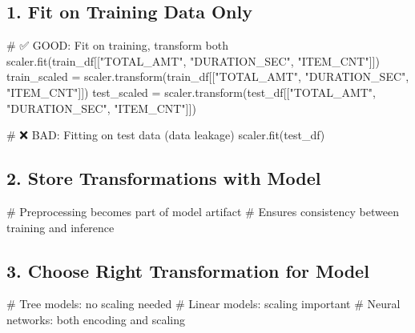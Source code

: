 \documentclass[
  letterpaper,
  DIV=11,
  numbers=noendperiod]{scrreprt}
\newenvironment{Shaded}{\begin{snugshade}}{\end{snugshade}}
\newcommand{\CommentTok}[1]{\textcolor[rgb]{0.37,0.37,0.37}{#1}}
\newcommand{\NormalTok}[1]{\textcolor[rgb]{0.00,0.23,0.31}{#1}}
\newcommand{\OperatorTok}[1]{\textcolor[rgb]{0.37,0.37,0.37}{#1}}
\newcommand{\StringTok}[1]{\textcolor[rgb]{0.13,0.47,0.30}{#1}}
\begin{document}
\hypertarget{fit-on-training-data-only}{%
\subsection{1. Fit on Training Data
Only}\label{fit-on-training-data-only}}

\begin{Shaded}
\begin{Highlighting}[]
\CommentTok{\# ✅ GOOD: Fit on training, transform both}
\NormalTok{scaler.fit(train\_df[[}\StringTok{"TOTAL\_AMT"}\NormalTok{, }\StringTok{"DURATION\_SEC"}\NormalTok{, }\StringTok{"ITEM\_CNT"}\NormalTok{]])}
\NormalTok{train\_scaled }\OperatorTok{=}\NormalTok{ scaler.transform(train\_df[[}\StringTok{"TOTAL\_AMT"}\NormalTok{, }\StringTok{"DURATION\_SEC"}\NormalTok{, }\StringTok{"ITEM\_CNT"}\NormalTok{]])}
\NormalTok{test\_scaled }\OperatorTok{=}\NormalTok{ scaler.transform(test\_df[[}\StringTok{"TOTAL\_AMT"}\NormalTok{, }\StringTok{"DURATION\_SEC"}\NormalTok{, }\StringTok{"ITEM\_CNT"}\NormalTok{]])}

\CommentTok{\# ❌ BAD: Fitting on test data (data leakage)}
\NormalTok{scaler.fit(test\_df)}
\end{Highlighting}
\end{Shaded}

\hypertarget{store-transformations-with-model}{%
\subsection{2. Store Transformations with
Model}\label{store-transformations-with-model}}

\begin{Shaded}
\begin{Highlighting}[]
\CommentTok{\# Preprocessing becomes part of model artifact}
\CommentTok{\# Ensures consistency between training and inference}
\end{Highlighting}
\end{Shaded}

\hypertarget{choose-right-transformation-for-model}{%
\subsection{3. Choose Right Transformation for
Model}\label{choose-right-transformation-for-model}}

\begin{Shaded}
\begin{Highlighting}[]
\CommentTok{\# Tree models: no scaling needed}
\CommentTok{\# Linear models: scaling important}
\CommentTok{\# Neural networks: both encoding and scaling}
\end{Highlighting}
\end{Shaded}
\end{document}
